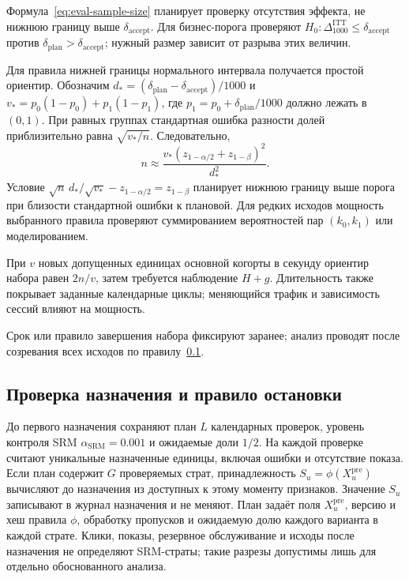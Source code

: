 \documentclass[12pt,a4paper]{article}
\theoremstyle{plainru}
\begin{document}
Формула~\eqref{eq:eval-sample-size} планирует проверку отсутствия эффекта,
не нижнюю границу выше $\delta_{\mathrm{accept}}$.
Для бизнес-порога проверяют
$H_0:\Delta_{1000}^{\mathrm{ITT}}\le\delta_{\mathrm{accept}}$
против $\delta_{\mathrm{plan}}>\delta_{\mathrm{accept}}$;
нужный размер зависит от разрыва этих величин.

Для правила нижней границы нормального интервала получается простой
ориентир. Обозначим $d_*=(\delta_{\mathrm{plan}}-
\delta_{\mathrm{accept}})/1000$ и
$v_*=p_0(1-p_0)+p_1(1-p_1)$, где $p_1=p_0+\delta_{\mathrm{plan}}/1000$
должно лежать в $(0,1)$. При равных группах стандартная ошибка
разности долей приблизительно равна $\sqrt{v_*/n}$. Следовательно,
\begin{equation}\label{eq:eval-threshold-power}
n\approx\frac{v_*(z_{1-\alpha/2}+z_{1-\beta})^2}{d_*^2}.
\end{equation}
Условие $\sqrt{n}\,d_*/\sqrt{v_*}-z_{1-\alpha/2}=z_{1-\beta}$
планирует нижнюю границу выше порога при близости стандартной ошибки
к плановой. Для редких исходов мощность выбранного правила проверяют
суммированием вероятностей пар $(k_0,k_1)$ или моделированием.

При $v$ новых допущенных единицах основной когорты в секунду
ориентир набора равен $2n/v$,
затем требуется наблюдение $H+g$. Длительность также покрывает заданные
календарные циклы; меняющийся трафик и зависимость сессий влияют на мощность.

Срок или правило завершения набора фиксируют заранее; анализ проводят
после созревания всех исходов по правилу~\ref{sec:eval-srm-stop}.

\subsection{Проверка назначения и правило остановки}
\label{sec:eval-srm-stop}

До первого назначения сохраняют план $L$ календарных проверок,
уровень контроля SRM $\alpha_{\mathrm{SRM}}=0.001$ и ожидаемые доли $1/2$.
На каждой проверке считают уникальные назначенные единицы, включая
ошибки и отсутствие показа. Если план содержит $G$ проверяемых страт,
принадлежность $S_u=\phi(X_u^{\mathrm{pre}})$ вычисляют до назначения
из доступных к этому моменту признаков. Значение $S_u$ записывают
в журнал назначения и не меняют. План задаёт поля $X_u^{\mathrm{pre}}$,
версию и хеш правила $\phi$, обработку пропусков и ожидаемую долю
каждого варианта в каждой страте. Клики, показы, резервное обслуживание
и исходы после назначения не определяют SRM-страты; такие разрезы
допустимы лишь для отдельно обоснованного анализа.
\end{document}
